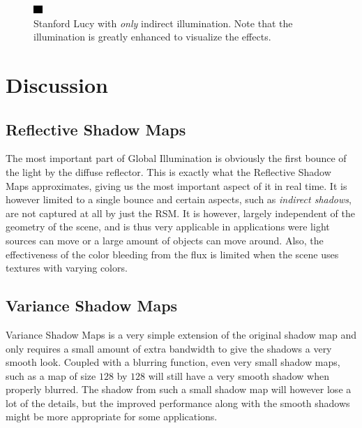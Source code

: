 \documentclass{acmsiggraph}               %
\begin{document}
\begin{figure}[tb]
    \centering
    \includegraphics[width=0.7\columnwidth]{./images/p1-gi-exp.png}
    \caption{Stanford Lucy with \emph{only} indirect illumination. Note that the illumination is greatly enhanced to visualize the effects.}
    \label{fig:oind}
\end{figure}


\section{Discussion}
\subsection{Reflective Shadow Maps}
The most important part of Global Illumination is obviously the first bounce of the light by the diffuse reflector. This is exactly what the Reflective Shadow Maps approximates, giving us the most important aspect of it in real time. It is however limited to a single bounce and certain aspects, such as \emph{indirect shadows}, are not captured at all by just the RSM. It is however, largely independent of the geometry of the scene, and is thus very applicable in applications were light sources can move or a large amount of objects can move around. Also, the effectiveness of the color bleeding from the flux is limited when the scene uses textures with varying colors.


\subsection{Variance Shadow Maps}
Variance Shadow Maps is a very simple extension of the original shadow map and only requires a small amount of extra bandwidth to give the shadows a very smooth look. Coupled with a blurring function, even very small shadow maps, such as a map of size $128$ by $128$ will still have a very smooth shadow when properly blurred. The shadow from such a small shadow map will however lose a lot of the details, but the improved performance along with the smooth shadows might be more appropriate for some applications.
\end{document}
